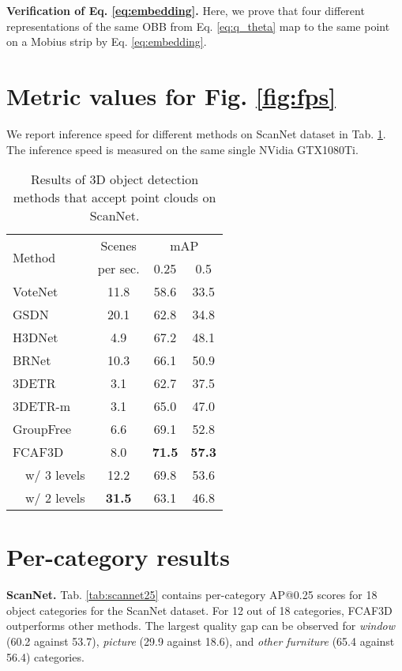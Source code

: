 \documentclass[runningheads]{llncs}
\begin{document}
\textbf{Verification of Eq. \ref{eq:embedding}.}
Here, we prove that four different representations of the same OBB from Eq. \ref{eq:q_theta} map to the same point on a Mobius strip by Eq. \ref{eq:embedding}.


\section{Metric values for Fig. \ref{fig:fps}}

We report inference speed for different methods on ScanNet dataset in Tab. \ref{tab:fps}. The inference speed is measured on the same single NVidia GTX1080Ti.

\begin{table}[h!]
    \centering \setlength{\tabcolsep}{2.5pt}
    \begin{tabular}{l|ccc}
    \hline
    \multirow[l]{2}{*}{Method} & Scenes & \multicolumn{2}{c}{mAP} \\
    & per sec. & 0.25 & 0.5 \\ \hline
    VoteNet\cite{qi2019votenet} & 11.8 & 58.6 & 33.5 \\
    GSDN\cite{gwak2020gsdn} & 20.1 & 62.8 & 34.8 \\
    H3DNet\cite{zhang2020h3dnet} & 4.9 & 67.2 & 48.1 \\
    BRNet\cite{cheng2021brnet} & 10.3 & 66.1 & 50.9 \\
    3DETR\cite{misra20213detr} & 3.1 & 62.7 & 37.5 \\
    3DETR-m\cite{misra20213detr} & 3.1 & 65.0 & 47.0 \\
    GroupFree\cite{liu2021group-free} & 6.6 & 69.1 & 52.8 \\
    FCAF3D & 8.0 & \textbf{71.5} & \textbf{57.3} \\
    \ \  w/ 3 levels & 12.2 & 69.8 & 53.6 \\
    \ \  w/ 2 levels & \textbf{31.5} & 63.1 & 46.8 \\ \hline
    \end{tabular}
    \caption{Results of 3D object detection methods that accept point clouds on ScanNet.}
    \label{tab:fps}
\end{table}

\section{Per-category results}

\textbf{ScanNet.} Tab. \ref{tab:scannet25} contains per-category AP@0.25 scores for 18 object categories for the ScanNet dataset. For 12 out of 18 categories, FCAF3D outperforms other methods. The largest quality gap can be observed for \textit{window} (60.2 against 53.7), \textit{picture} (29.9 against 18.6), and \textit{other furniture} (65.4 against 56.4) categories.
\end{document}
